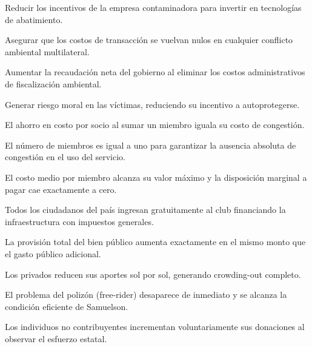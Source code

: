 \begin{opts}
    \item Reducir los incentivos de la empresa contaminadora para invertir en tecnologías de abatimiento.
    \item Asegurar que los costos de transacción se vuelvan nulos en cualquier conflicto ambiental multilateral.
    \item Aumentar la recaudación neta del gobierno al eliminar los costos administrativos de fiscalización ambiental.
    \item Generar riesgo moral en las víctimas, reduciendo su incentivo a autoprotegerse.
\end{opts}

\begin{opts}
    \item El ahorro en costo por socio al sumar un miembro iguala su costo de congestión.
    \item El número de miembros es igual a uno para garantizar la ausencia absoluta de congestión en el uso del servicio.
    \item El costo medio por miembro alcanza su valor máximo y la disposición marginal a pagar cae exactamente a cero.
    \item Todos los ciudadanos del país ingresan gratuitamente al club financiando la infraestructura con impuestos generales.
\end{opts}

\begin{opts}
    \item La provisión total del bien público aumenta exactamente en el mismo monto que el gasto público adicional.
    \item Los privados reducen sus aportes sol por sol, generando crowding-out completo.
    \item El problema del polizón (free-rider) desaparece de inmediato y se alcanza la condición eficiente de Samuelson.
    \item Los individuos no contribuyentes incrementan voluntariamente sus donaciones al observar el esfuerzo estatal.
\end{opts}

